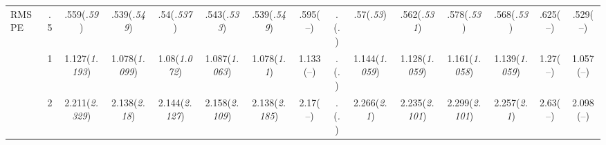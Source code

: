 \documentclass{article}
\begin{document}
\begin{table}[tbp]
{\begin{tabularx}{\textwidth}{lCCCCCCCCCCCCCC}
\midrule RMSPE&.5&.559\newline (\emph{.59})&.539\newline (\emph{.549})&.54\newline (\emph{.537})&.543\newline (\emph{.533})&.539\newline (\emph{.549})&.595\newline (--)&.\newline (\emph{.})&.57\newline (\emph{.53})&.562\newline (\emph{.531})&.578\newline (\emph{.53})&.568\newline (\emph{.53})&.625\newline (--)&.529\newline (--) \tabularnewline
&1&1.127\newline (\emph{1.193})&1.078\newline (\emph{1.099})&1.08\newline (\emph{1.072})&1.087\newline (\emph{1.063})&1.078\newline (\emph{1.1})&1.133\newline (--)&.\newline (\emph{.})&1.144\newline (\emph{1.059})&1.128\newline (\emph{1.059})&1.161\newline (\emph{1.058})&1.139\newline (\emph{1.059})&1.27\newline (--)&1.057\newline (--) \tabularnewline
&2&2.211\newline (\emph{2.329})&2.138\newline (\emph{2.18})&2.144\newline (\emph{2.127})&2.158\newline (\emph{2.109})&2.138\newline (\emph{2.185})&2.17\newline (--)&.\newline (\emph{.})&2.266\newline (\emph{2.1})&2.235\newline (\emph{2.101})&2.299\newline (\emph{2.101})&2.257\newline (\emph{2.1})&2.63\newline (--)&2.098\newline (--) \tabularnewline

\end{tabularx}}
\end{table}
\end{document}
